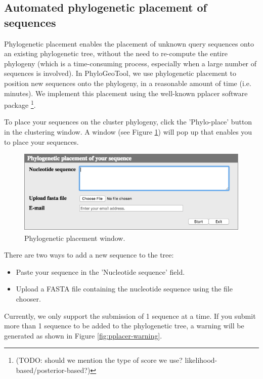 \documentclass[a4paper, 11pt]{article} %
\begin{document}
\subsection{Automated phylogenetic placement of sequences}
Phylogenetic placement enables the placement of unknown query sequences onto an existing phylogenetic tree, without the need to re-compute the entire phylogeny (which is a time-consuming process, especially when a large number of sequences is involved). 
In PhyloGeoTool, we use phylogenetic placement to position new sequences onto the phylogeny, in a reasonable amount of time (i.e. minutes). 
We implement this placement using the well-known pplacer software package \cite{Matsen2010} \footnote{(TODO: should we mention the type of score we use? likelihood-based/posterior-based?)}.

To place your sequences on the cluster phylogeny, click the 'Phylo-place' button in the clustering window. 
A window (see Figure \ref{fig:pplacerwindow}) will pop up that enables you to place your sequences. 

\begin{figure}[H]
\centering
\includegraphics[scale=0.50]{images/pplacerWindow.png}
\vspace{-0.25cm}
\caption{Phylogenetic placement window.}
\label{fig:pplacerwindow}
\end{figure}

There are two ways to add a new sequence to the tree:
\begin{itemize}
\item Paste your sequence in the 'Nucleotide sequence' field.
\item Upload a FASTA file containing the nucleotide sequence using the file chooser.
\end{itemize}
Currently, we only support the submission of 1 sequence at a time.
If you submit more than 1 sequence to be added to the phylogenetic tree, a warning will be generated as shown in Figure \ref{fig:pplacer-warning}.
\end{document}

